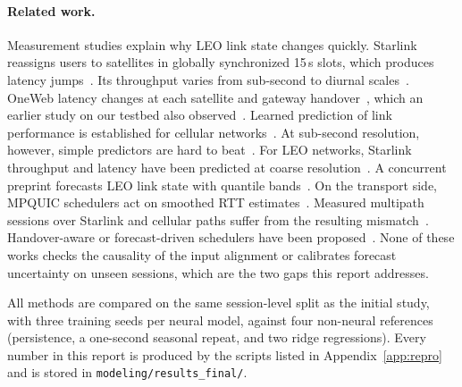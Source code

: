 \paragraph{Related work.} Measurement studies explain why LEO link state changes quickly. Starlink reassigns users to satellites in globally synchronized 15\,s slots, which produces latency jumps~\cite{mohan2024multifaceted,tanveer2023making}. Its throughput varies from sub-second to diurnal scales~\cite{garcia2023multitimescale}. OneWeb latency changes at each satellite and gateway handover~\cite{zhao2025measuring}, which an earlier study on our testbed also observed~\cite{perrin2025measurement}. Learned prediction of link performance is established for cellular networks~\cite{narayanan2020lumos5g,mei2019realtime}. At sub-second resolution, however, simple predictors are hard to beat~\cite{basit2024predictability}. For LEO networks, Starlink throughput and latency have been predicted at coarse resolution~\cite{liu2025vivisecting,benghe2026horizon}. A concurrent preprint forecasts LEO link state with quantile bands~\cite{chi2026reading}. On the transport side, MPQUIC schedulers act on smoothed RTT estimates~\cite{paasch2014experimental,lim2017ecf}. Measured multipath sessions over Starlink and cellular paths suffer from the resulting mismatch~\cite{baltaci2023multipath}. Handover-aware or forecast-driven schedulers have been proposed~\cite{yang2024mams,maglione2025intelligent}. None of these works checks the causality of the input alignment or calibrates forecast uncertainty on unseen sessions, which are the two gaps this report addresses.

All methods are compared on the same session-level split as the initial study, with three training seeds per neural model, against four non-neural references (persistence, a one-second seasonal repeat, and two ridge regressions). Every number in this report is produced by the scripts listed in Appendix~\ref{app:repro} and is stored in \texttt{modeling/\allowbreak{}results\_\allowbreak{}final/\allowbreak{}}.
